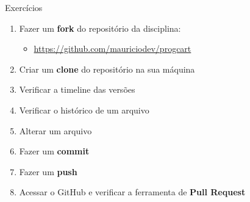 \documentclass{beamer}
\begin{document}
\begin{frame}{Exercícios}
    
    \begin{enumerate}
        \item Fazer um \textbf{fork} do repositório da disciplina:
        \begin{itemize}
            \item \url{https://github.com/mauriciodev/progcart}
        \end{itemize}
        
        \item Criar um \textbf{clone} do repositório na sua máquina
        \item Verificar a timeline das versões
        \item Verificar o histórico de um arquivo
        \item Alterar um arquivo
        \item Fazer um \textbf{commit}
        \item Fazer um \textbf{push}
        \item Acessar o GitHub e verificar a ferramenta de \textbf{Pull Request}
    \end{enumerate}
    
\end{frame}



%
%
%           
%           
%       
\end{document}
